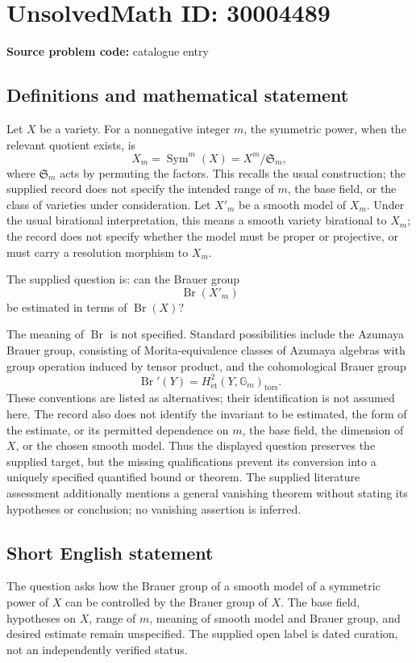 \documentclass[11pt]{article}
\begin{document}
\section*{UnsolvedMath ID: 30004489}
\textbf{Source problem code:} catalogue entry
\subsection{Definitions and mathematical statement}
Let \(X\) be a variety. For a nonnegative integer \(m\), the symmetric power, when the relevant quotient exists, is
\[
X_m=\operatorname{Sym}^{m}(X)=X^{m}/\mathfrak S_m,
\]
where \(\mathfrak S_m\) acts by permuting the factors. This recalls the usual construction; the supplied record does not specify the intended range of \(m\), the base field, or the class of varieties under consideration. Let \(X'_m\) be a smooth model of \(X_m\). Under the usual birational interpretation, this means a smooth variety birational to \(X_m\); the record does not specify whether the model must be proper or projective, or must carry a resolution morphism to \(X_m\).

The supplied question is: can the Brauer group
\[
\operatorname{Br}(X'_m)
\]
be estimated in terms of \(\operatorname{Br}(X)\)?

The meaning of \(\operatorname{Br}\) is not specified. Standard possibilities include the Azumaya Brauer group, consisting of Morita-equivalence classes of Azumaya algebras with group operation induced by tensor product, and the cohomological Brauer group
\[
\operatorname{Br}'(Y)=H^2_{\mathrm{\acute et}}(Y,\mathbb G_m)_{\mathrm{tors}}.
\]
These conventions are listed as alternatives; their identification is not assumed here. The record also does not identify the invariant to be estimated, the form of the estimate, or its permitted dependence on \(m\), the base field, the dimension of \(X\), or the chosen smooth model. Thus the displayed question preserves the supplied target, but the missing qualifications prevent its conversion into a uniquely specified quantified bound or theorem. The supplied literature assessment additionally mentions a general vanishing theorem without stating its hypotheses or conclusion; no vanishing assertion is inferred.
\subsection{Short English statement}
The question asks how the Brauer group of a smooth model of a symmetric power of \(X\) can be controlled by the Brauer group of \(X\). The base field, hypotheses on \(X\), range of \(m\), meaning of smooth model and Brauer group, and desired estimate remain unspecified. The supplied open label is dated curation, not an independently verified status.
\end{document}
